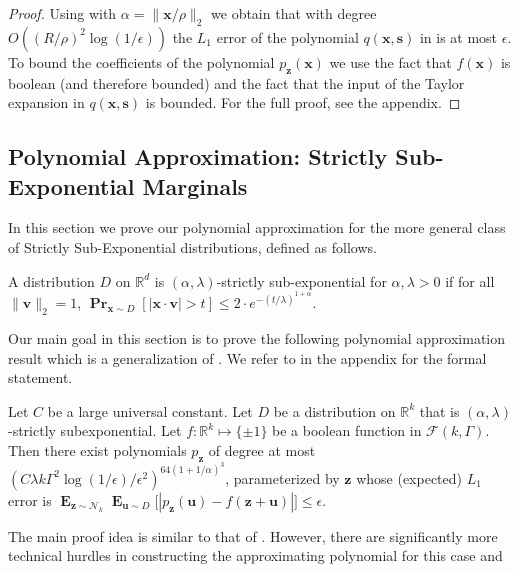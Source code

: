 \documentclass{theoretics}
\newcommand\twonorm[1]{\|#1\|_2}
\renewcommand\vec[1]{\mathbf{#1}}
\DeclareMathOperator*{\pr}{\mathbf{Pr}}
\DeclareMathOperator*{\E}{\mathbf{E}}
\newcommand{\R}{\mathbb{R}}
\newcommand{\eps}{\epsilon}
\newcommand{\1}{\Ind}
\newcommand{\x}{\vec x}
\renewcommand{\vv}{\vec v}
\newcommand{\vu}{\vec u}
\newcommand{\z}{\vec z}
\newcommand{\Gauss}{\mathcal{N}}
\begin{document}
\begin{proof}
Using  with $\alpha=\twonorm{\x/\rho}$ we obtain that 
with degree $O((R/\rho)^2 \log(1/\eps))$ the $L_1$ error of the polynomial $q(\x, \vec s)$ in  is at most $\eps$.   To bound the coefficients of the polynomial $p_\vec z(\x)$ we use the fact that $f(\x)$ is boolean (and therefore bounded) and the fact that the input of the Taylor expansion in $q(\x, \vec s)$ is bounded.
For 
the full proof, see the appendix.%
\end{proof}


\subsection{Polynomial Approximation: Strictly Sub-Exponential Marginals}
\label{sec:polynomial-sub-exp}
In this section we prove our polynomial approximation for the more general class of Strictly Sub-Exponential
distributions, defined as follows.
\begin{definition}
    \label{def:strict_subexp}
    A distribution $D$ on $\R^d$ is $(\alpha,\lambda)$-strictly sub-exponential for $\alpha,\lambda>0$ 
    if for all $\twonorm{\vv}=1$, 
        \(
          \pr_{\x\sim D}[|\x\cdot \vv|>t ]\leq 2\cdot e^{-(t/\lambda)^{1+\alpha}} 
        \).
\end{definition}
Our main goal in this section is to prove the following polynomial approximation result which is a generalization of . We refer to  
in the appendix for the formal statement.
\begin{proposition}
    \label{lem:poly_approx_boolean_subexp_main_body}
    Let $C$ be a large universal constant.
    Let $D$ be a distribution on $\R^k$ that is $(\alpha,\lambda)$-strictly subexponential. Let 
    $f:\R^k \mapsto \{\pm 1\}$ be a boolean function in $\mathcal{F}(k, \Gamma)$.
    Then there exist polynomials $p_{\z}$ of degree at most 
     $\left(C \lambda k\Gamma^2\log (1/\epsilon)/\epsilon^2\right)^{64(1+1/\alpha)^3}$,
    parameterized by $\z$ whose (expected) $L_1$ error is $\E_{\z\sim \Gauss_k}\E_{\vu\sim D}\bigl[|p_{\z}(\vu)-f(\z+\vu)|\bigr] \leq \epsilon$.
\end{proposition}
The main proof idea is similar to that of .   However, there are significantly more technical hurdles in constructing the approximating polynomial for this case and
\end{document}
